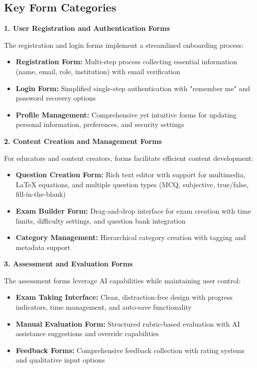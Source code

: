 \documentclass[12pt,a4paper,oneside]{book}
\begin{document}
\subsection{Key Form Categories}

\textbf{1. User Registration and Authentication Forms}

The registration and login forms implement a streamlined onboarding process:

\begin{itemize}
    \item \textbf{Registration Form:} Multi-step process collecting essential information (name, email, role, institution) with email verification
    \item \textbf{Login Form:} Simplified single-step authentication with "remember me" and password recovery options
    \item \textbf{Profile Management:} Comprehensive yet intuitive forms for updating personal information, preferences, and security settings
\end{itemize}

\textbf{2. Content Creation and Management Forms}

For educators and content creators, forms facilitate efficient content development:

\begin{itemize}
    \item \textbf{Question Creation Form:} Rich text editor with support for multimedia, LaTeX equations, and multiple question types (MCQ, subjective, true/false, fill-in-the-blank)
    \item \textbf{Exam Builder Form:} Drag-and-drop interface for exam creation with time limits, difficulty settings, and question bank integration
    \item \textbf{Category Management:} Hierarchical category creation with tagging and metadata support
\end{itemize}

\textbf{3. Assessment and Evaluation Forms}

The assessment forms leverage AI capabilities while maintaining user control:

\begin{itemize}
    \item \textbf{Exam Taking Interface:} Clean, distraction-free design with progress indicators, time management, and auto-save functionality
    \item \textbf{Manual Evaluation Form:} Structured rubric-based evaluation with AI assistance suggestions and override capabilities
    \item \textbf{Feedback Forms:} Comprehensive feedback collection with rating systems and qualitative input options
\end{itemize}
\end{document}
